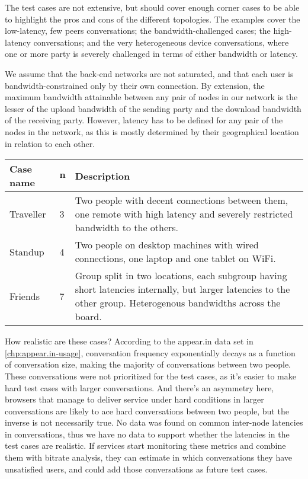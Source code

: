 The test cases are not extensive, but should cover enough corner cases to be able to highlight the pros and cons of the different topologies. The examples cover the low-latency, few peers conversations; the bandwidth-challenged cases; the high-latency conversations; and the very heterogeneous device conversations, where one or more party is severely challenged in terms of either bandwidth or latency.

We assume that the back-end networks are not saturated, and that each user is bandwidth-constrained only by their own connection. By extension, the maximum bandwidth attainable between any pair of nodes in our network is the lesser of the upload bandwidth of the sending party and the download bandwidth of the receiving party. However, latency has to be defined for any pair of the nodes in the network, as this is mostly determined by their geographical location in relation to each other.

\begin{center}
    \label{tab:test-cases}
    \begin{tabular}{| l | l | p{7cm} |}
    \hline
    \textbf{Case name} & $\textbf{n}$ & \textbf{Description} \\ \hline
    Traveller & 3 & Two people with decent connections between them, one remote with high latency and severely restricted bandwidth to the others. \\ \hline
    Standup & 4 & Two people on desktop machines with wired connections, one laptop and one tablet on WiFi. \\ \hline
    Friends & 7 & Group split in two locations, each subgroup having short latencies internally, but larger latencies to the other group. Heterogenous bandwidths across the board. \\ \hline
    \end{tabular}
\end{center}

How realistic are these cases? According to the appear.in data set in \autoref{chp:appear.in-usage}, conversation frequency exponentially decays as a function of conversation size, making the majority of conversations between two people. These conversations were not prioritized for the test cases, as it's easier to make hard test cases with larger conversations. And there's an asymmetry here, browsers that manage to deliver service under hard conditions in larger conversations are likely to ace hard conversations between two people, but the inverse is not necessarily true. No data was found on common inter-node latencies in conversations, thus we have no data to support whether the latencies in the test cases are realistic. If services start monitoring these metrics and combine them with bitrate analysis, they can estimate in which conversations they have unsatisfied users, and could add those conversations as future test cases.


